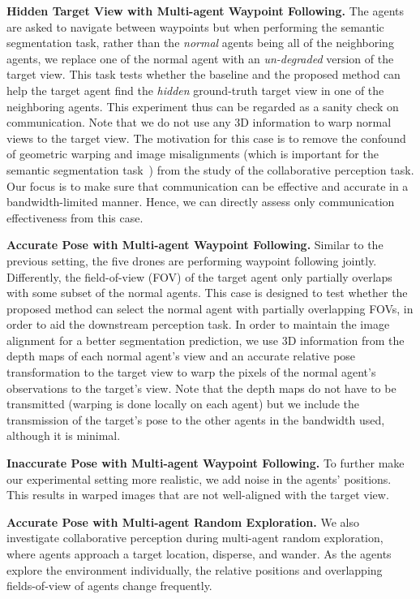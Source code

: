 \textbf{Hidden Target View with Multi-agent Waypoint Following.} 
The agents are asked to navigate between waypoints but when performing the semantic segmentation task, rather than the \textit{normal} agents being all of the neighboring agents, we replace one of the normal agent with an \textit{un-degraded} version of the target view. 
This task tests whether the baseline and the proposed method can help the target agent find the \textit{hidden} ground-truth target view in one of the neighboring agents. 
This experiment thus can be regarded as a sanity check on communication. 
Note that we do not use any 3D information to warp normal views to the target view. 
The motivation for this case is to remove the confound of geometric warping and image misalignments (which is important for the semantic segmentation task~\cite{ronneberger2015u})
from the study of the collaborative perception task.
Our focus is to make sure that communication can be effective and accurate in a bandwidth-limited manner.
Hence, we can directly assess only communication effectiveness from this case.

\textbf{Accurate Pose with Multi-agent Waypoint Following.}  
Similar to the previous setting, the five drones are performing waypoint following  jointly. 
Differently, the field-of-view (FOV) of the target agent only partially overlaps with some subset of the normal agents. 
This case is designed to test whether the proposed method can select the normal agent with partially overlapping FOVs, in order to aid the downstream perception task. 
In order to maintain the image alignment for a better segmentation prediction, we use 3D information from the depth maps of each normal agent's view and an accurate relative pose transformation to the target view to warp the pixels of the normal agent's observations to the target's view. Note that the depth maps do not have to be transmitted (warping is done locally on each agent) but we include the transmission of the target's pose to the other agents in the bandwidth used, although it is minimal.

\textbf{Inaccurate Pose with Multi-agent Waypoint Following.} To further make our experimental setting more realistic, we add noise in the  agents' positions. This results in warped images that are not well-aligned with the target view.

\textbf{Accurate Pose with Multi-agent Random Exploration.} We also investigate collaborative perception during multi-agent random exploration, where agents approach a target location, disperse, and wander. As the agents explore the environment individually, the relative positions and overlapping fields-of-view of agents change frequently.

